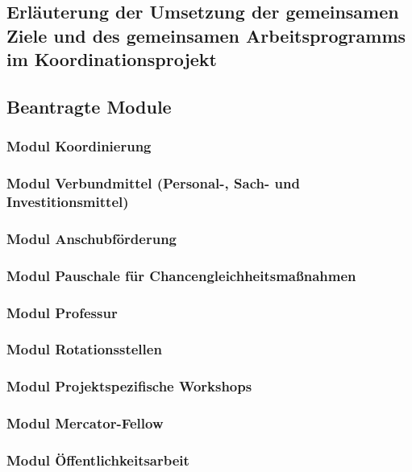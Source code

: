 \documentclass[german, 53.02]{proposal}
\begin{document}
\subsection{Erläuterung der Umsetzung der gemeinsamen Ziele und des gemeinsamen Arbeitsprogramms im Koordinationsprojekt}

\subsection{Beantragte Module}

\subsubsection{Modul Koordinierung}

\subsubsection{Modul Verbundmittel (Personal-, Sach- und Investitionsmittel)}

\subsubsection{Modul Anschubförderung}

\subsubsection{Modul Pauschale für Chancengleichheitsmaßnahmen}

\subsubsection{Modul Professur}

\subsubsection{Modul Rotationsstellen}

\subsubsection{Modul Projektspezifische Workshops}

\subsubsection{Modul Mercator-Fellow}

\subsubsection{Modul Öffentlichkeitsarbeit}
\end{document}
